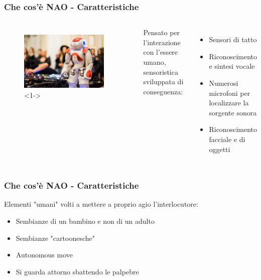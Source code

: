 \documentclass[aspectratio=169]{beamer}
\begin{document}
\begin{frame}
\frametitle{Che cos'è NAO - Caratteristiche}
\begin{columns}
		\begin{figure}[ht]
		\begin{center}
		\includegraphics[width=0.9\textwidth]{nao8.jpg}<1->
		\end{center}
		\end{figure}
		Pensato per l'interazione con l'essere umano, sensoristica sviluppata di conseguenza:
		\begin{itemize}
			\item<2-> Sensori di tatto
			\item<3-> Riconoscimento e sintesi vocale
			\item<4-> Numerosi microfoni per localizzare la sorgente sonora
			\item<5-> Riconoscimento facciale e di oggetti
		\end{itemize}
\end{columns}
\end{frame}

\begin{frame}
\frametitle{Che cos'è NAO - Caratteristiche}
Elementi "umani" volti a mettere a proprio agio l'interlocutore:
\begin{itemize}
	\item<2-> Sembianze di un bambino e non di un adulto
	\item<3-> Sembianze "cartoonesche"
	\item<4-> Autonomous move
	\item<5-> Si guarda attorno sbattendo le palpebre
\end{itemize}
\end{frame}
\end{document}
